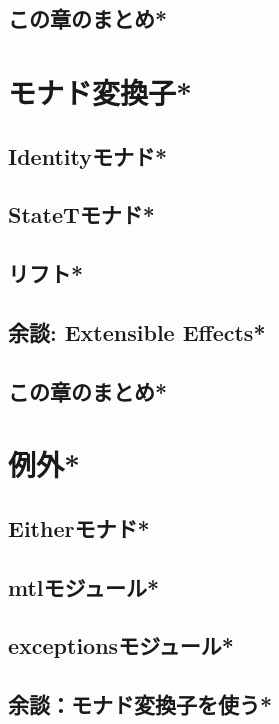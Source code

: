\documentclass[a4paper,twocolumn]{jsbook}
\begin{document}
\section{この章のまとめ*}

\chapter{モナド変換子*}
\section{Identityモナド*}
\section{StateTモナド*}
\section{リフト*}
\section{余談: Extensible Effects*}
\section{この章のまとめ*}

\chapter{例外*}
\section{Eitherモナド*}
\section{mtlモジュール*}
\section{exceptionsモジュール*}
\section{余談：モナド変換子を使う*}
\end{document}
